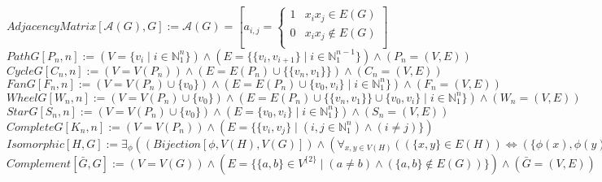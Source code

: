 \documentclass{book}
\newcommand{\abr}{:=}
\newcommand{\pr}[1]{\left(#1\right)}
\newcommand{\st}{\mathbin{|}}
\newcommand{\utup}[1]{\{#1\}}
\begin{document}
$AdjacencyMatrix[\mathcal{A}(G), G] \abr \mathcal{A}(G) = \left[a_{i, j} = 
\begin{cases} 
  1 & x_i x_j \in E(G) \\
  0 &  x_i x_j \notin E(G) \\
\end{cases}\right]$ \\

$PathG[P_n, n] \abr (V = \{v_i \st i \in \mathbb{N}_1^n\}) \land (E = \{\utup{v_i, v_{i + 1}} \st i \in \mathbb{N}_1^{n - 1}\}) \land \pr{P_n = (V, E)}$ \\

$CycleG[C_n, n] \abr \pr{V = V(P_n)} \land \pr{E = E(P_n) \cup \{\utup{v_n, v_1}\}} \land \pr{C_n = (V, E)}$ \\
$FanG[F_n, n] \abr \pr{V = V(P_n) \cup \{v_0\}} \land \pr{E = E(P_n) \cup \utup{v_0, v_i} \st i \in \mathbb{N}_1^n\}} \land \pr{F_n = (V, E)}$ \\
$WheelG[W_n, n] \abr \pr{V = V(P_n) \cup \{v_0\}} \land \pr{E = E(P_n) \cup \{\utup{v_n, v_1}\} \cup \utup{v_0, v_i} \st i \in \mathbb{N}_1^n\}} \land \pr{W_n = (V, E)}$ \\
$StarG[S_n, n] \abr \pr{V = V(P_n) \cup \{v_0\}} \land (E = \utup{v_0, v_i} \st i \in \mathbb{N}_1^n\}) \land \pr{S_n = (V, E)}$ \\
$CompleteG[K_n, n] \abr \pr{V = V(P_n)} \land \pr{E = \{\utup{v_i, v_j} \st (i, j \in \mathbb{N}_1^n) \land (i \neq j)\}}$ \\

$Isomorphic[H, G] \abr \exists_{\phi}\pr{\pr{Bijection[\phi, V(H), V(G)]} \land \pr{\forall_{x, y \in V(H)}\pr{\pr{\utup{x, y} \in E(H)} \iff \pr{\utup{\phi(x), \phi(y)} \in E(G)}}}}$ \\

$Complement[\bar{G}, G] \abr \pr{V = V(G)} \land \pr{E = \{\utup{a, b} \in V^{\{2\}} \st (a \neq b) \land \pr{\utup{a, b} \notin E(G)}\}} \land \pr{\bar{G} = (V, E)}$ \\
\end{document}
